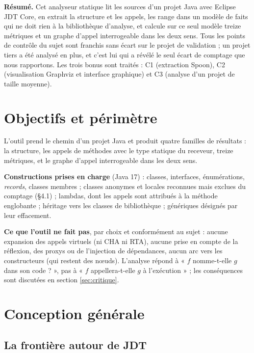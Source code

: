 \documentclass[11pt,a4paper]{article}
\begin{document}
\tableofcontents
\vspace{0.8cm}

\noindent\textbf{Résumé.} Cet analyseur statique lit les sources d'un projet Java avec Eclipse JDT Core, en extrait la structure et les appels, les range dans un modèle de faits qui ne doit rien à la bibliothèque d'analyse, et calcule sur ce seul modèle treize métriques et un graphe d'appel interrogeable dans les deux sens. Tous les points de contrôle du sujet sont franchis sans écart sur le projet de validation ; un projet tiers a été analysé en plus, et c'est lui qui a révélé le seul écart de comptage que nous rapportons. Les trois bonus sont traités : C1 (extraction Spoon), C2 (visualisation Graphviz et interface graphique) et C3 (analyse d'un projet de taille moyenne).

\newpage

\section{Objectifs et périmètre}

L'outil prend le chemin d'un projet Java et produit quatre familles de résultats : la structure, les appels de méthodes avec le type statique du receveur, treize métriques, et le graphe d'appel interrogeable dans les deux sens.

\textbf{Constructions prises en charge} (Java 17) : classes, interfaces, énumérations, \textit{records}, classes membres ; classes anonymes et locales reconnues mais exclues du comptage (§4.1) ; lambdas, dont les appels sont attribués à la méthode englobante ; héritage vers les classes de bibliothèque ; génériques désignés par leur effacement.

\textbf{Ce que l'outil ne fait pas}, par choix et conformément au sujet : aucune expansion des appels virtuels (ni CHA ni RTA), aucune prise en compte de la réflexion, des proxys ou de l'injection de dépendances, aucun arc vers les constructeurs (qui restent des n\oe{}uds). L'analyse répond à « $f$ nomme-t-elle $g$ dans son code ? », pas à « $f$ appellera-t-elle $g$ à l'exécution » ; les conséquences sont discutées en section \ref{sec:critique}.

\section{Conception générale}

\subsection{La frontière autour de JDT}
\end{document}
